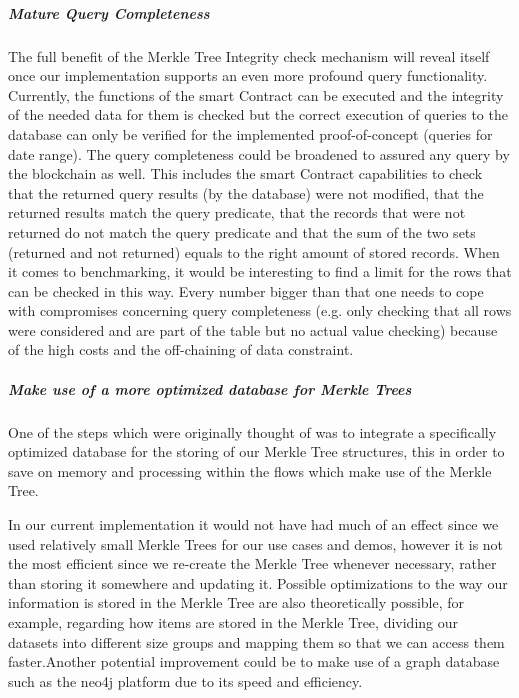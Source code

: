 \subparagraph{Mature Query Completeness}
The full benefit of the Merkle Tree Integrity check mechanism will reveal itself once our implementation supports an even more profound query functionality. Currently, the functions of the smart Contract can be executed and the integrity of the needed data for them is checked but the correct execution of queries to the database can only be verified for the implemented proof-of-concept (queries for date range). The query completeness could be broadened to assured any query by the blockchain as well. This includes the smart Contract capabilities to check that the returned query results (by the database) were not modified, that the returned results match the query predicate, that the records that were not returned do not match the query predicate and that the sum of the two sets (returned and not returned) equals to the right amount of stored records.
When it comes to benchmarking, it would be interesting to find a limit for the rows that can be checked in this way. Every number bigger than that one needs to cope with compromises concerning query completeness (e.g. only checking that all rows were considered and are part of the table but no actual value checking) because of the high costs and the off-chaining of data constraint.


\subparagraph{Make use of a more optimized database for Merkle Trees}
One of the steps which were originally thought of was to integrate a specifically optimized database for the storing of our Merkle Tree structures, this in order to save on memory and processing within the flows which make use of the Merkle Tree.

In our current implementation it would not have had much of an effect since we used relatively small Merkle Trees for our use cases and demos, however it is not the most efficient since we re-create the Merkle Tree whenever necessary, rather than storing it somewhere and updating it.
Possible optimizations to the way our information is stored in the Merkle Tree are also theoretically possible, for example, regarding how items are stored in the Merkle Tree, dividing our datasets into different size groups and mapping them so that we can access them faster.Another potential improvement could be to make use of a graph database such as the neo4j platform due to its speed and efficiency.


